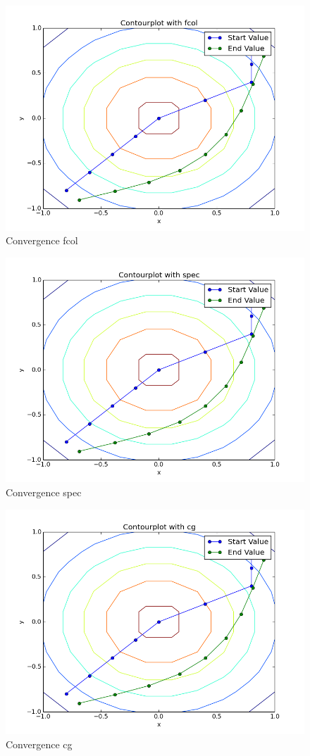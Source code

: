 \documentclass{article}
\begin{document}
\begin{figure}[H]
  \centering
  \includegraphics[scale=0.5]{2fcol.png}
  \caption{Convergence fcol}
\end{figure}
\begin{figure}[H]
  \centering
  \includegraphics[scale=0.5]{2spec.png}
  \caption{Convergence spec}
\end{figure}
\begin{figure}[H]
  \centering
  \includegraphics[scale=0.5]{2cg.png}
  \caption{Convergence cg}
\end{figure}
\end{document}
